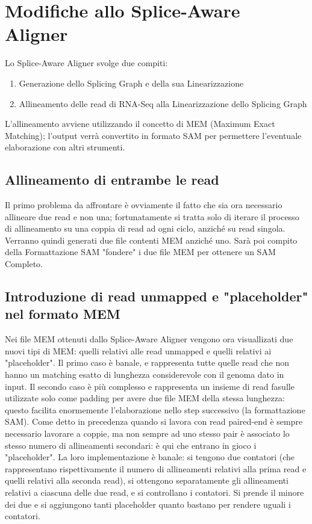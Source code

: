 \section{Modifiche allo Splice-Aware Aligner}
Lo Splice-Aware Aligner svolge due compiti:
\begin{enumerate}
	\item Generazione dello Splicing Graph e della sua Linearizzazione
	\item Allineamento delle read di RNA-Seq alla Linearizzazione dello Splicing Graph
\end{enumerate}
L'allineamento avviene utilizzando il concetto di MEM (Maximum Exact Matching); l'output verrà convertito in formato SAM per permettere l'eventuale elaborazione con altri strumenti.

\subsection{Allineamento di entrambe le read}
Il primo problema da affrontare è ovviamente il fatto che sia ora necessario allineare due read e non una; fortunatamente si tratta solo di iterare il processo di allineamento su una coppia di read ad ogni ciclo, anziché su read singola. Verranno quindi generati due file contenti MEM anziché uno. Sarà poi compito della Formattazione SAM "fondere" i due file MEM per ottenere un SAM Completo.

\subsection{Introduzione di read unmapped e "placeholder" nel formato MEM}
Nei file MEM ottenuti dallo Splice-Aware Aligner vengono ora visuallizati due nuovi tipi di MEM: quelli relativi alle read unmapped e quelli relativi ai "placeholder". Il primo caso è banale, e rappresenta tutte quelle read che non hanno un matching esatto di lunghezza considerevole con il genoma dato in input.
Il secondo caso è più complesso e rappresenta un insieme di read fasulle utilizzate solo come padding per avere due file MEM della stessa lunghezza: questo facilita enormemente l'elaborazione nello step successivo (la formattazione SAM). Come detto in precedenza quando si lavora con read paired-end è sempre necessario lavorare a coppie, ma non sempre ad uno stesso pair è associato lo stesso numero di allineamenti secondari: è qui che entrano in gioco i "placeholder". La loro implementazione è banale: si tengono due contatori (che rappresentano rispettivamente il numero di allineamenti relativi alla prima read e quelli relativi alla seconda read), si ottengono separatamente gli allineamenti relativi a ciascuna delle due read, e si controllano i contatori. Si prende il minore dei due e si aggiungono tanti placeholder quanto bastano per rendere uguali i contatori.

